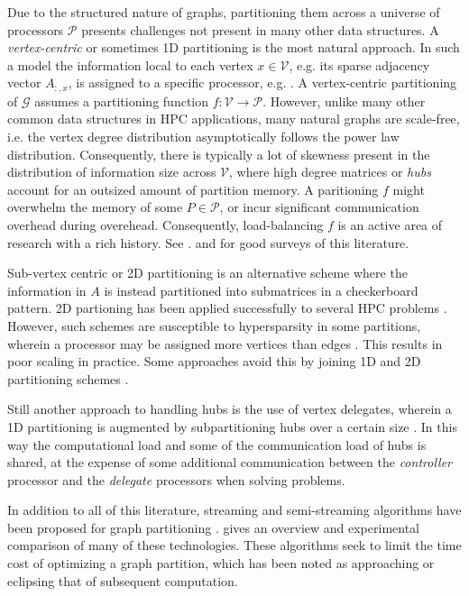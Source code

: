 \documentclass[10]{report}
\begin{document}
Due to the structured nature of graphs, partitioning them across a universe of processors $\mathcal{P}$ presents challenges not present in many other data structures.
A \emph{vertex-centric} or sometimes 1D partitioning is the most natural approach.
In such a model the information local to each vertex $x \in \mathcal{V}$, e.g. its sparse adjacency vector $A_{:,x}$, is assigned to a specific processor, e.g. \cite{malewicz2010pregel}.
A vertex-centric partitioning of $\mathcal{G}$ assumes a partitioning function $f: \mathcal{V} \rightarrow \mathcal{P}$.
However, unlike many other common data structures in HPC applications, many natural graphs are scale-free, i.e. the vertex degree distribution asymptotically follows the power law distribution.
Consequently, there is typically a lot of skewness present in the distribution of information size across $\mathcal{V}$, where high degree matrices or \emph{hubs} account for an outsized amount of partition memory.
A paritioning $f$ might overwhelm the memory of some $P \in \mathcal{P}$, or incur significant communication overhead during overehead.
Consequently, load-balancing $f$ is an active area of research with a rich history.
See \cite{mccune2015thinking}. and \cite{bulucc2016recent} for good surveys of this literature. 

Sub-vertex centric or 2D partitioning is an alternative scheme where the information in $A$ is instead partitioned into submatrices in a checkerboard pattern.
2D partioning has been applied successfully to several HPC problems \cite{bulucc2011parallel, yoo2011scalable, simmhan2014goffish}.
However, such schemes are susceptible to hypersparsity in some partitions, wherein a processor may be assigned more vertices than edges \cite{buluc2008representation}.
This results in poor scaling in practice.
Some approaches avoid this by joining 1D and 2D partitioning schemes \cite{boman2013scalable}.

Still another approach to handling hubs is the use of vertex delegates, wherein a 1D partitioning is augmented by subpartitioning hubs over a certain size \cite{pearce2014faster}.
In this way the computational load and some of the communication load of hubs is shared, at the expense of some additional communication between the \emph{controller} processor and the \emph{delegate} processors when solving problems.

In addition to all of this literature, streaming and semi-streaming algorithms have been proposed for graph partitioning \cite{stanton2012streaming, tsourakakis2014fennel, xu2015heterogeneous}.
\cite{guo2017modeling} gives an overview and experimental comparison of many of these technologies.
These algorithms seek to limit the time cost of optimizing a graph partition, which has been noted as approaching or eclipsing that of subsequent computation.
 
\end{document}
